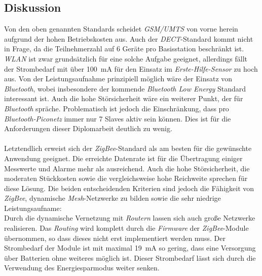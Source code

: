     \subsection{Diskussion}
        Von den oben genannten Standards scheidet \emph{GSM/UMTS} von vorne herein aufgrund der hohen Betriebskosten aus.
        Auch der \emph{DECT}-Standard kommt nicht in Frage, da die Teilnehmerzahl auf 6 Geräte pro Basisstation beschränkt
        ist. \emph{WLAN} ist zwar grundsätzlich für eine solche Aufgabe geeignet, allerdings fällt der 
        Strombedarf mit über 100~mA für den Einsatz im \emph{Erste-Hilfe-Sensor} zu hoch aus. Von der Leistungsaufnahme 
        prinzipiell möglich wäre der Einsatz von \emph{Bluetooth}, wobei insbesondere der kommende 
        \emph{Bluetooth Low Energy} Standard interessant ist. Auch die
        hohe Störsicherheit wäre ein weiterer Punkt, der für \emph{Bluetooth} spräche. Problematisch ist jedoch die 
        Einschränkung, dass pro \emph{Bluetooth-Piconetz} immer nur 7 Slaves aktiv sein können. Dies ist für die 
        Anforderungen dieser Diplomarbeit deutlich zu wenig.\\
        \\
        Letztendlich erweist sich der \emph{ZigBee}-Standard als am besten für die gewünschte Anwendung geeignet. 
        Die erreichte Datenrate ist für die Übertragung einiger Messwerte und Alarme mehr als ausreichend. Auch die 
        hohe Störsicherheit, die moderaten Stückkosten sowie die vergleichsweise hohe Reichweite sprechen für diese Lösung. 
        Die beiden entscheidenden Kriterien sind jedoch die Fähigkeit von \emph{ZigBee}, dynamische \emph{Mesh}-Netzwerke 
        zu bilden sowie die sehr niedrige Leistungsaufname:\\
        Durch die dynamische Vernetzung mit \emph{Routern} lassen sich auch große Netzwerke realisieren. Das 
        \emph{Routing} wird komplett durch die \emph{Firmware} der \emph{ZigBee}-Module übernommen, so dass dieses 
        nicht erst implementiert werden muss. Der Strombedarf
        der Module ist mit maximal 19~mA so gering, dass eine Versorgung über Batterien ohne weiteres möglich ist.
        Dieser Strombedarf lässt sich durch die Verwendung des Energiesparmodus weiter senken.

